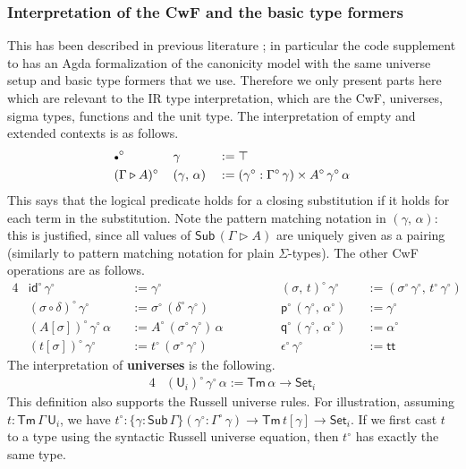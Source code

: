 \documentclass[acmsmall,screen,review,anonymous]{acmart}
\newcommand{\msf}[1]{{\mathsf{#1}}}
\newcommand{\mbb}[1]{\mathbb{#1}}
\newcommand{\p}{\mathsf{p}}
\newcommand{\q}{\mathsf{q}}
\newcommand{\U}{\msf{U}}
\newcommand{\Set}{\msf{Set}}
\newcommand{\ttt}{\msf{tt}}
\newcommand{\emptycon}{\scaleobj{.75}\bullet}
\newcommand{\id}{\msf{id}}
\newcommand{\Sub}{\msf{Sub}}
\newcommand{\Tm}{\msf{Tm}}
\newcommand{\ext}{\triangleright}
\newcommand{\w}{\circ}
\newcommand{\G}{\mbb{G}}
\begin{document}

\subsubsection{Interpretation of the CwF and the basic type formers}

This has been described in previous literature \cite{TODO}; in particular the code supplement to
\cite{TODO} has an Agda formalization of the canonicity model with the same universe setup and basic
type formers that we use. Therefore we only present parts here which are relevant to the IR type
interpretation, which are the CwF, universes, sigma types, functions and the unit type. The
interpretation of empty and extended contexts is as follows.
\begin{alignat*}{3}
  &\emptycon^\w\,&&\gamma                 &&:= \top \\
  &(\Gamma\ext A)^\w\,&&(\gamma,\,\alpha) &&:= (\gamma^\w : \Gamma^\w\,\gamma) \times A^\w\,\gamma^\w\,\alpha
\end{alignat*}
This says that the logical predicate holds for a closing substitution if it holds for each term in
the substitution. Note the pattern matching notation in $(\gamma,\,\alpha)$: this is justified,
since all values of $\Sub\,(\Gamma\ext A)$ are uniquely given as a pairing (similarly to pattern
matching notation for plain $\Sigma$-types). The other CwF operations are as follows.
\begin{alignat*}{4}
  &\id^\w\,\gamma^\w                   &&:= \gamma^\w                  &&(\sigma,\,t)^\w\,\gamma^\w          &&:= (\sigma^\w\,\gamma^\w,\,t^\w\,\gamma^\w)\\
  &(\sigma \circ \delta)^\w\,\gamma^\w &&:= \sigma^\w\,(\delta^\w\,\gamma^\w) && \p^\w\,(\gamma^\w,\,\alpha^\w)      &&:= \gamma^\w\\
  &(A[\sigma]) ^\w\,\gamma^\w\,\alpha  &&:= A^\w\,(\sigma^\w\,\gamma^\w)\,\alpha\hspace{3em} && \q^\w\,(\gamma^\w,\,\alpha^\w)      &&:= \alpha^\w\\
  &(t[\sigma]) ^\w\,\gamma^\w          &&:= t^\w\,(\sigma^\w\,\gamma^\w) && \epsilon^\w\,\gamma^\w              &&:= \ttt
\end{alignat*}
The interpretation of \textbf{universes} is the following.
\begin{alignat*}{4}
  &(\U_i)^\w\,\gamma^\w\,\alpha := \Tm\,\alpha \to \Set_i
\end{alignat*}
This definition also supports the Russell universe rules. For illustration, assuming $t :
\Tm\,\Gamma\,\U_i$, we have $t^\w : \{\gamma : \Sub\,\Gamma\}(\gamma^\w : \Gamma^\w\,\gamma) \to
\Tm\,t[\gamma] \to \Set_i$. If we first cast $t$ to a type using the syntactic Russell
universe equation, then $t^\w$ has exactly the same type.
\end{document}
